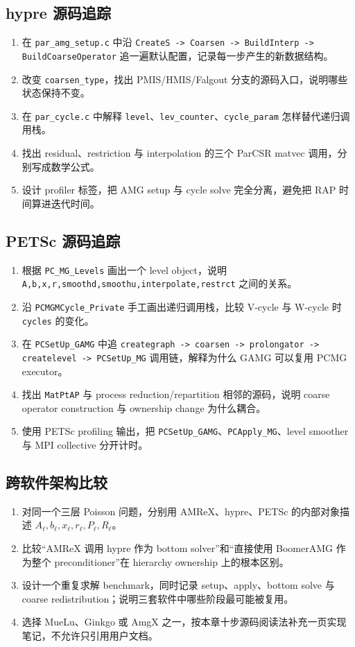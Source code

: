 \subsection*{hypre 源码追踪}
\begin{enumerate}[label=\arabic*.]
\item 在 \texttt{par\_amg\_setup.c} 中沿
\texttt{CreateS -> Coarsen -> BuildInterp -> BuildCoarseOperator}
追一遍默认配置，记录每一步产生的新数据结构。
\item 改变 \texttt{coarsen\_type}，找出 PMIS/HMIS/Falgout 分支的源码入口，说明哪些状态保持不变。
\item 在 \texttt{par\_cycle.c} 中解释
\texttt{level}、\texttt{lev\_counter}、\texttt{cycle\_param}
怎样替代递归调用栈。
\item 找出 residual、restriction 与 interpolation 的三个 ParCSR matvec 调用，分别写成数学公式。
\item 设计 profiler 标签，把 AMG setup 与 cycle solve 完全分离，避免把 RAP 时间算进迭代时间。
\end{enumerate}

\subsection*{PETSc 源码追踪}
\begin{enumerate}[label=\arabic*.]
\item 根据 \texttt{PC\_MG\_Levels} 画出一个 level object，说明
\texttt{A,b,x,r,smoothd,smoothu,interpolate,restrct}
之间的关系。
\item 沿 \texttt{PCMGMCycle\_Private} 手工画出递归调用栈，比较 V-cycle 与 W-cycle 时 \texttt{cycles} 的变化。
\item 在 \texttt{PCSetUp\_GAMG} 中追
\texttt{creategraph -> coarsen -> prolongator -> createlevel -> PCSetUp\_MG}
调用链，解释为什么 GAMG 可以复用 PCMG executor。
\item 找出 \texttt{MatPtAP} 与 process reduction/repartition 相邻的源码，说明 coarse operator construction 与 ownership change 为什么耦合。
\item 使用 PETSc profiling 输出，把 \texttt{PCSetUp\_GAMG}、\texttt{PCApply\_MG}、level smoother 与 MPI collective 分开计时。
\end{enumerate}

\subsection*{跨软件架构比较}
\begin{enumerate}[label=\arabic*.]
\item 对同一个三层 Poisson 问题，分别用 AMReX、hypre、PETSc 的内部对象描述
$A_\ell,b_\ell,x_\ell,r_\ell,P_\ell,R_\ell$。
\item 比较“AMReX 调用 hypre 作为 bottom solver”和“直接使用 BoomerAMG 作为整个 preconditioner”在 hierarchy ownership 上的根本区别。
\item 设计一个重复求解 benchmark，同时记录 setup、apply、bottom solve 与 coarse redistribution；说明三套软件中哪些阶段最可能被复用。
\item 选择 MueLu、Ginkgo 或 AmgX 之一，按本章十步源码阅读法补充一页实现笔记，不允许只引用用户文档。
\end{enumerate}
